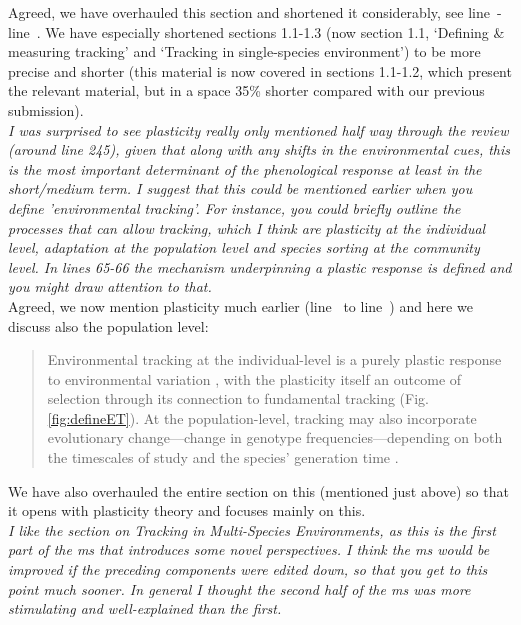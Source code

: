 \documentclass[11pt]{article}
\newcommand{\lr}[1]{line~\lineref{#1}}
\begin{document}
Agreed, we have overhauled this section and shortened it considerably, see \lr{plasS}-\lr{bhE}. We have especially shortened sections 1.1-1.3 (now section 1.1, `Defining \& measuring tracking' and `Tracking in single-species environment') to be more precise and shorter (this material is now covered in sections 1.1-1.2, which present the relevant material, but in a space 35\% shorter compared with our previous submission).\\

\emph{I was surprised to see plasticity really only mentioned half way through the review (around
line 245), given that along with any shifts in the environmental cues, this is the most
important determinant of the phenological response at least in the short/medium term. I
suggest that this could be mentioned earlier when you define 'environmental tracking'. For
instance, you could briefly outline the processes that can allow tracking, which I think are
plasticity at the individual level, adaptation at the population level and species sorting at
the community level.  In lines 65-66 the mechanism underpinning a plastic response is defined
and you might draw attention to that.}\\

Agreed, we now mention plasticity much earlier (\lr{Bminusbstart} to \lr{itsnotevo}) and here we discuss also the population level: 

\begin{quote}
 Environmental tracking at the individual-level is a purely plastic response to environmental variation \citep[in line with current findings on most climate change responses,][]{bonamour2019}, with the plasticity itself an outcome of selection \citep{chevin2010} through its connection to fundamental tracking (Fig. \ref{fig:defineET}). At the population-level, tracking may also incorporate evolutionary change---change in genotype frequencies---depending on both the timescales of study and the species' generation time \citep[this evolutionary response can be predicted as the difference between the environmental sensitivity of phenotypic selection and an organism's plasticity, $|B-b|$ in][]{chevin2010}.
\end{quote}
We have also overhauled the entire section on this (mentioned just above) so that it opens with plasticity theory and focuses mainly on this.\\

\emph{I like the section on Tracking in Multi-Species Environments, as this is the first part of
the ms that introduces some novel perspectives. I think the ms would be improved if the
preceding components were edited down, so that you get to this point much sooner. In general
I thought the second half of the ms was more stimulating and well-explained than the first.}\\
\end{document}
